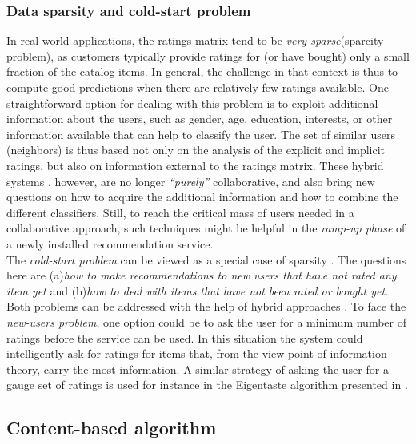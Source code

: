 \subsubsection{Data sparsity and cold-start problem}\label{coldstart}
In real-world applications, the ratings matrix tend to be \textit{very
sparse}(sparcity problem), as customers typically provide  ratings
for (or have bought) only a small fraction of the catalog items. In
general, the challenge in that context is thus to compute good
predictions when there are relatively few ratings available. One
straightforward option for dealing with this problem is to exploit
additional information about the users, such as gender, age,
education, interests, or other information available that can help to
classify the user. The set of similar users (neighbors) is thus based
not only on the analysis of the explicit and implicit ratings, but
also on information external to the ratings matrix. These hybrid
systems \cite{pazzani2007content}, however, are no longer
\textit{“purely”} collaborative, and also bring new questions on how to acquire
the additional information and how to combine the different
classifiers. Still, to reach the critical mass of users needed
in a collaborative approach, such techniques might be helpful in the
\textit{ramp-up phase} of a newly installed recommendation service. \\
The \textit{cold-start problem} can be viewed as a special case of
sparsity \cite{huang2004applying}. The questions here are (a)\textit{how 
to make recommendations to new users that have not rated
any item yet} and (b)\textit{how to deal with items that have not
been rated or bought yet}. Both problems can be addressed with the
help of hybrid approaches \cite{adomavicius2005toward}.  To face the
\textit{new-users problem}, one option could be to ask the user for a
minimum number of ratings before the service can be used. In this
situation the system could intelligently ask for ratings for items
that, from the view point of information theory, carry the most
information\cite{rashid2002getting}. A similar strategy of asking
the user for a gauge set of ratings is used for instance in the Eigentaste
algorithm presented in \cite{goldberg2001eigentaste}.

\subsection{Content-based algorithm}

